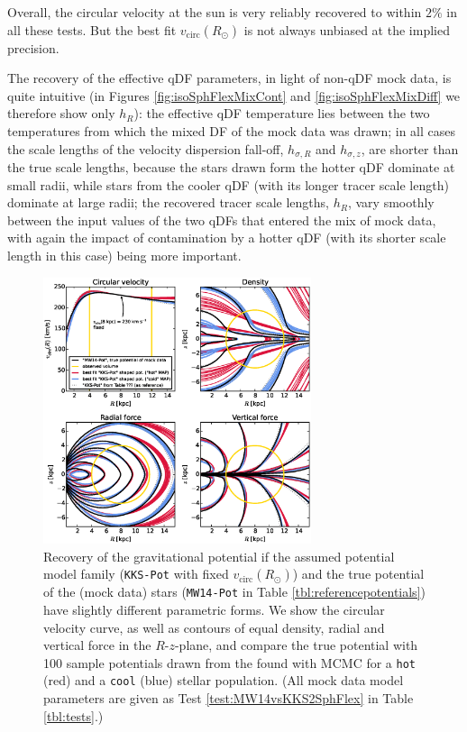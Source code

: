 Overall, the circular velocity at the sun is very reliably recovered to within $2\%$ in all these tests. But the best fit $v_\text{circ}(R_\odot)$ is not always unbiased at the implied precision.

The recovery of the effective qDF parameters, in light of non-qDF mock data, is quite intuitive (in Figures \ref{fig:isoSphFlexMixCont} and \ref{fig:isoSphFlexMixDiff} we therefore show only $h_R$): the effective qDF temperature lies between the two temperatures from which the mixed DF of the mock data was drawn; in all cases the scale lengths of the velocity dispersion fall-off, $h_{\sigma,R}$ and $h_{\sigma,z}$, are shorter than the true scale lengths, because the stars drawn form the hotter qDF dominate at small radii, while stars from the cooler qDF (with its longer tracer scale length) dominate at large radii; the recovered tracer scale lengths, $h_R$, vary smoothly between the input values of the two qDFs that entered the mix of mock data, with again the impact of contamination by a hotter qDF (with its shorter scale length in this case) being more important. 


\begin{figure}[!htbp]
\centering
\includegraphics[width=0.7\textwidth]{figs/MW14vsKKS2SphFlex_contours_compare.eps}
\caption{Recovery of the gravitational potential if the assumed potential model family (\texttt{KKS-Pot} with fixed $v_\text{circ}(R_\odot)$) and the true potential of the (mock data) stars (\texttt{MW14-Pot} in Table \ref{tbl:referencepotentials}) have slightly different parametric forms. We show the circular velocity curve, as well as contours of equal density, radial and vertical force in the $R$-$z$-plane, and compare the true potential with 100 sample potentials drawn from the \pdf{} found with MCMC for a \texttt{hot} (red) and a \texttt{cool} (blue) stellar population. (All mock data model parameters are given as Test \ref{test:MW14vsKKS2SphFlex} in Table \ref{tbl:tests}.)}
\label{fig:MW14vsKKS2SphFlex}
\end{figure}

